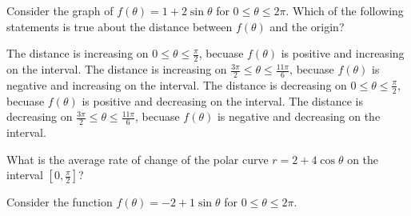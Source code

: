 \documentclass[addpoints]{exam}
\begin{document}
\begin{questions}
\question[2] Consider the graph of $f(\theta)=1+2\sin\theta$ for $0\leq\theta\leq2\pi$. Which of the following statements is true about the distance between $f(\theta)$ and the origin?
\begin{choices}
    \choice The distance is increasing on $0\le\theta\le\frac{\pi}{2}$, becuase $f(\theta)$ is positive and increasing on the interval.
    \choice The distance is increasing on $\frac{3\pi}{2}\le\theta\le\frac{11\pi}{6}$, becuase $f(\theta)$ is negative and increasing on the interval.
    \choice The distance is decreasing on $0\le\theta\le\frac{\pi}{2}$, becuase $f(\theta)$ is positive and decreasing on the interval.
    \choice The distance is decreasing on $\frac{3\pi}{2}\le\theta\le\frac{11\pi}{6}$, becuase $f(\theta)$ is negative and decreasing on the interval.    
\end{choices}


\question[2]  What is the average rate of change of the polar curve $r=2+4\cos\theta$ on the interval $\displaystyle\left[0,\frac{\pi}{2}\right]$?


\newpage

\question Consider the function $f(\theta)=-2+1\sin\theta$ for $0\leq\theta\leq2\pi$.




\end{questions}
\end{document}
